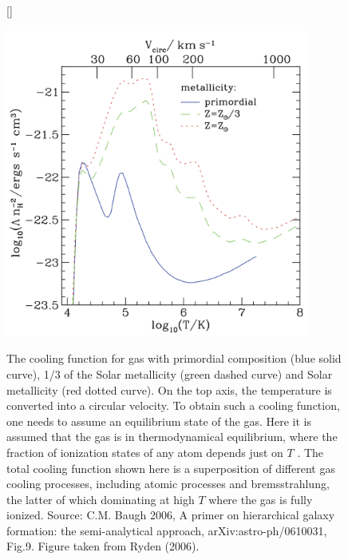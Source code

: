 \documentclass[a4paper,11pt]{article}
\begin{document}
\begin{figure}[t]
    [\FBwidth]
    {\caption{\footnotesize{The cooling function for gas with primordial composition (blue solid curve), 1/3 of the Solar metallicity (green dashed curve) and Solar metallicity (red dotted curve). On the top axis, the temperature is converted into a circular velocity. To obtain such a cooling function, one needs to assume an equilibrium state of the gas. Here it is assumed that the gas is in thermodynamical equilibrium, where the fraction of ionization states of any atom depends just on $T$ . The total cooling function shown here is a superposition of different gas cooling processes, including atomic processes and bremsstrahlung, the latter of which dominating at high $T$ where the gas is fully ionized. Source: C.M. Baugh 2006, A primer on hierarchical galaxy formation: the semi-analytical approach, arXiv:astro-ph/0610031, Fig.9. Figure taken from Ryden (2006).}}
    \label{fig:coolingfunction}}
    {\includegraphics[width=10cm]{figures/CoolingFunction.png}}
\end{figure}
\end{document}

